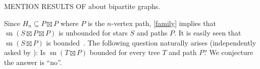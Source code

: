 \documentclass[kpfonts]{patmorin}
\DeclareMathOperator{\sn}{sn}
\begin{document}
MENTION RESULTS OF \citet{Pupyrev20} about bipartite graphs.

Since $H_n\subseteq P \boxtimes P$ where $P$ is the $n$-vertex path, \cref{family} implies that $\sn(S\boxtimes P\boxtimes P)$ is unbounded for stars $S$ and paths $P$. It is easily seen that $\sn(S\boxtimes P)$ is bounded~\citep{Pupyrev20}. The following question naturally arises (independently asked by \citet{Pupyrev20}):
Is $\sn(T \boxtimes P)$ bounded for every tree $T$ and path $P$? We conjecture the answer is ``no''.

%


\end{document}

